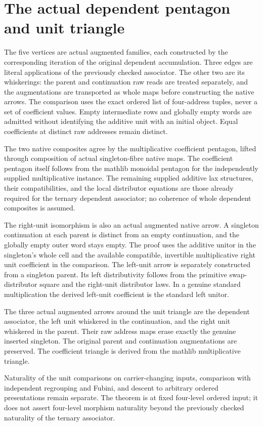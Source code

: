 \documentclass{article}
\begin{document}
\section*{The actual dependent pentagon and unit triangle}
The five vertices are actual augmented families, each constructed by
the corresponding iteration of the original dependent accumulation.
Three edges are literal applications of the previously checked
associator. The other two are its whiskerings: the parent and
continuation raw reads are treated separately, and the augmentations
are transported as whole maps before constructing the native arrows.
The comparison uses the exact ordered list of four-address tuples,
never a set of coefficient values. Empty intermediate rows and
globally empty words are admitted without identifying the additive
unit with an initial object. Equal coefficients at distinct raw
addresses remain distinct.

The two native composites agree by the multiplicative coefficient
pentagon, lifted through composition of actual singleton-fibre native
maps. The coefficient pentagon itself follows from the mathlib
monoidal pentagon for the independently supplied multiplicative
instance. The remaining supplied additive lax structures, their
compatibilities, and the local distributor equations are those
already required for the ternary dependent associator; no coherence
of whole dependent composites is assumed.

The right-unit isomorphism is also an actual augmented native
arrow. A singleton continuation at each parent is distinct from an
empty continuation, and the globally empty outer word stays empty.
The proof uses the additive unitor in the singleton's whole cell and
the available compatible, invertible multiplicative right unit
coefficient in the comparison. The left-unit arrow is separately constructed from
a singleton parent. Its left distributivity follows from the
primitive swap-distributor square and the right-unit distributor
laws. In a genuine standard multiplication the derived left-unit
coefficient is the standard left unitor.

The three actual augmented arrows around the unit triangle are
the dependent associator, the left unit whiskered in the continuation,
and the right unit whiskered in the parent. Their raw address maps
erase exactly the genuine inserted singleton. The original parent
and continuation augmentations are preserved. The coefficient
triangle is derived from the mathlib multiplicative triangle.

Naturality of the unit comparisons on carrier-changing inputs,
comparison with independent regrouping and Fubini, and descent
to arbitrary ordered presentations remain separate. The theorem is at fixed four-level ordered input;
it does not assert four-level morphism naturality beyond the
previously checked naturality of the ternary associator.
\end{document}
